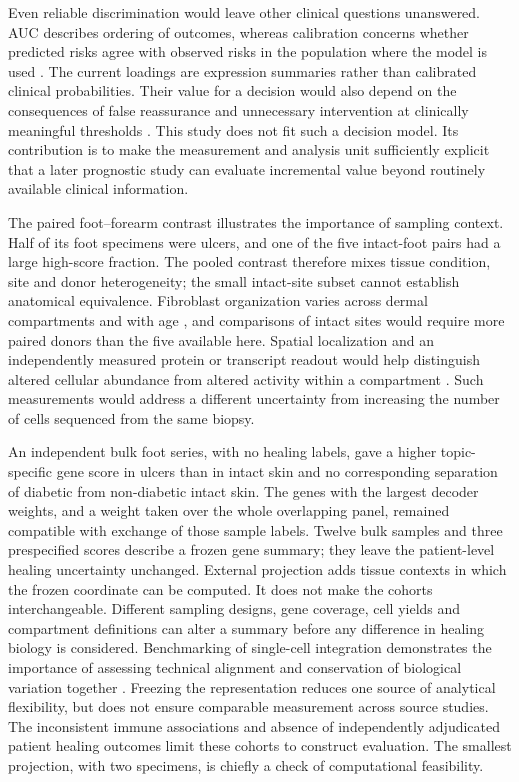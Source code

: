 \documentclass[10pt,a4paper]{article}
\begin{document}
Even reliable discrimination would leave other clinical questions unanswered. AUC describes ordering of outcomes, whereas calibration concerns whether predicted risks agree with observed risks in the population where the model is used \citep{steyerberg2010,vancalster2019}. The current loadings are expression summaries rather than calibrated clinical probabilities. Their value for a decision would also depend on the consequences of false reassurance and unnecessary intervention at clinically meaningful thresholds \citep{vickers2006}. This study does not fit such a decision model. Its contribution is to make the measurement and analysis unit sufficiently explicit that a later prognostic study can evaluate incremental value beyond routinely available clinical information.

The paired foot--forearm contrast illustrates the importance of sampling context. Half of its foot specimens were ulcers, and one of the five intact-foot pairs had a large high-score fraction. The pooled contrast therefore mixes tissue condition, site and donor heterogeneity; the small intact-site subset cannot establish anatomical equivalence. Fibroblast organization varies across dermal compartments and with age \citep{driskell2013,soleboldo2020}, and comparisons of intact sites would require more paired donors than the five available here. Spatial localization and an independently measured protein or transcript readout would help distinguish altered cellular abundance from altered activity within a compartment \citep{foster2021,kotliar2019}. Such measurements would address a different uncertainty from increasing the number of cells sequenced from the same biopsy.

An independent bulk foot series, with no healing labels, gave a higher topic-specific gene score in ulcers than in intact skin and no corresponding separation of diabetic from non-diabetic intact skin. The genes with the largest decoder weights, and a weight taken over the whole overlapping panel, remained compatible with exchange of those sample labels. Twelve bulk samples and three prespecified scores describe a frozen gene summary; they leave the patient-level healing uncertainty unchanged. External projection adds tissue contexts in which the frozen coordinate can be computed. It does not make the cohorts interchangeable. Different sampling designs, gene coverage, cell yields and compartment definitions can alter a summary before any difference in healing biology is considered. Benchmarking of single-cell integration demonstrates the importance of assessing technical alignment and conservation of biological variation together \citep{luecken2022}. Freezing the representation reduces one source of analytical flexibility, but does not ensure comparable measurement across source studies. The inconsistent immune associations and absence of independently adjudicated patient healing outcomes limit these cohorts to construct evaluation. The smallest projection, with two specimens, is chiefly a check of computational feasibility.
\end{document}
